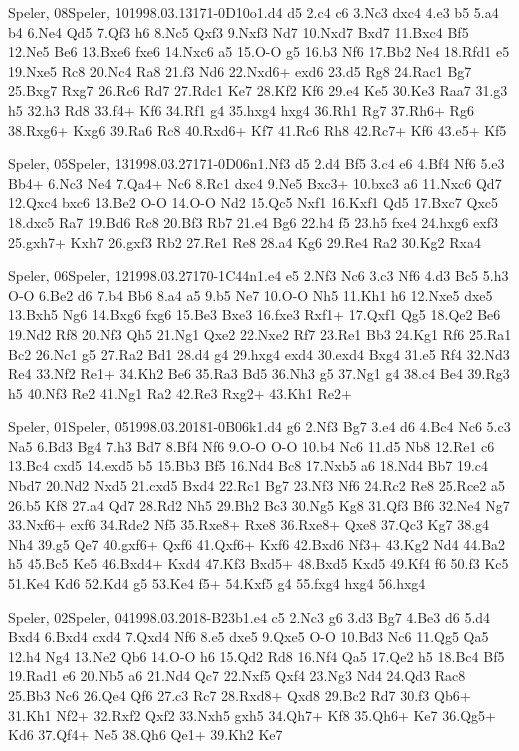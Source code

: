 \documentclass[twocolumn,a4paper,10pt]{report}
\begin{document}
\begin{chessgame}{Speler, 08}{Speler, 10}{1998.03.13}{17}{1-0}{D10o}{1.d4 d5 2.c4 c6 3.Nc3 dxc4 4.e3 b5 5.a4 b4 6.Ne4 Qd5 7.Qf3 h6 8.Nc5 Qxf3 9.Nxf3 Nd7 10.Nxd7 Bxd7 11.Bxc4 Bf5 12.Ne5 Be6 13.Bxe6 fxe6 14.Nxc6 a5 15.O-O g5 16.b3 Nf6 17.Bb2 Ne4 18.Rfd1 e5 19.Nxe5 Rc8 20.Nc4 Ra8 21.f3 Nd6 22.Nxd6+ exd6 23.d5 Rg8 24.Rac1 Bg7 25.Bxg7 Rxg7 26.Rc6 Rd7 27.Rdc1 Ke7 28.Kf2 Kf6 29.e4 Ke5 30.Ke3 Raa7 31.g3 h5 32.h3 Rd8 33.f4+ Kf6 34.Rf1 g4 35.hxg4 hxg4 36.Rh1 Rg7 37.Rh6+ Rg6 38.Rxg6+ Kxg6 39.Ra6 Rc8 40.Rxd6+ Kf7 41.Rc6 Rh8 42.Rc7+ Kf6 43.e5+ Kf5}\end{chessgame}
\begin{chessgame}{Speler, 05}{Speler, 13}{1998.03.27}{17}{1-0}{D06n}{1.Nf3 d5 2.d4 Bf5 3.c4 e6 4.Bf4 Nf6 5.e3 Bb4+ 6.Nc3 Ne4 7.Qa4+ Nc6 8.Rc1 dxc4 9.Ne5 Bxc3+ 10.bxc3 a6 11.Nxc6 Qd7 12.Qxc4 bxc6 13.Be2 O-O 14.O-O Nd2 15.Qc5 Nxf1 16.Kxf1 Qd5 17.Bxc7 Qxc5 18.dxc5 Ra7 19.Bd6 Rc8 20.Bf3 Rb7 21.e4 Bg6 22.h4 f5 23.h5 fxe4 24.hxg6 exf3 25.gxh7+ Kxh7 26.gxf3 Rb2 27.Re1 Re8 28.a4 Kg6 29.Re4 Ra2 30.Kg2 Rxa4}\end{chessgame}
\begin{chessgame}{Speler, 06}{Speler, 12}{1998.03.27}{17}{0-1}{C44n}{1.e4 e5 2.Nf3 Nc6 3.c3 Nf6 4.d3 Bc5 5.h3 O-O 6.Be2 d6 7.b4 Bb6 8.a4 a5 9.b5 Ne7 10.O-O Nh5 11.Kh1 h6 12.Nxe5 dxe5 13.Bxh5 Ng6 14.Bxg6 fxg6 15.Be3 Bxe3 16.fxe3 Rxf1+ 17.Qxf1 Qg5 18.Qe2 Be6 19.Nd2 Rf8 20.Nf3 Qh5 21.Ng1 Qxe2 22.Nxe2 Rf7 23.Re1 Bb3 24.Kg1 Rf6 25.Ra1 Bc2 26.Nc1 g5 27.Ra2 Bd1 28.d4 g4 29.hxg4 exd4 30.exd4 Bxg4 31.e5 Rf4 32.Nd3 Re4 33.Nf2 Re1+ 34.Kh2 Be6 35.Ra3 Bd5 36.Nh3 g5 37.Ng1 g4 38.c4 Be4 39.Rg3 h5 40.Nf3 Re2 41.Ng1 Ra2 42.Re3 Rxg2+ 43.Kh1 Re2+}\end{chessgame}
\begin{chessgame}{Speler, 01}{Speler, 05}{1998.03.20}{18}{1-0}{B06k}{1.d4 g6 2.Nf3 Bg7 3.e4 d6 4.Bc4 Nc6 5.c3 Na5 6.Bd3 Bg4 7.h3 Bd7 8.Bf4 Nf6 9.O-O O-O 10.b4 Nc6 11.d5 Nb8 12.Re1 c6 13.Bc4 cxd5 14.exd5 b5 15.Bb3 Bf5 16.Nd4 Bc8 17.Nxb5 a6 18.Nd4 Bb7 19.c4 Nbd7 20.Nd2 Nxd5 21.cxd5 Bxd4 22.Rc1 Bg7 23.Nf3 Nf6 24.Rc2 Re8 25.Rce2 a5 26.b5 Kf8 27.a4 Qd7 28.Rd2 Nh5 29.Bh2 Bc3 30.Ng5 Kg8 31.Qf3 Bf6 32.Ne4 Ng7 33.Nxf6+ exf6 34.Rde2 Nf5 35.Rxe8+ Rxe8 36.Rxe8+ Qxe8 37.Qc3 Kg7 38.g4 Nh4 39.g5 Qe7 40.gxf6+ Qxf6 41.Qxf6+ Kxf6 42.Bxd6 Nf3+ 43.Kg2 Nd4 44.Ba2 h5 45.Bc5 Ke5 46.Bxd4+ Kxd4 47.Kf3 Bxd5+ 48.Bxd5 Kxd5 49.Kf4 f6 50.f3 Kc5 51.Ke4 Kd6 52.Kd4 g5 53.Ke4 f5+ 54.Kxf5 g4 55.fxg4 hxg4 56.hxg4}\end{chessgame}
\begin{chessgame}{Speler, 02}{Speler, 04}{1998.03.20}{18}{\textonehalf-\textonehalf}{B23b}{1.e4 c5 2.Nc3 g6 3.d3 Bg7 4.Be3 d6 5.d4 Bxd4 6.Bxd4 cxd4 7.Qxd4 Nf6 8.e5 dxe5 9.Qxe5 O-O 10.Bd3 Nc6 11.Qg5 Qa5 12.h4 Ng4 13.Ne2 Qb6 14.O-O h6 15.Qd2 Rd8 16.Nf4 Qa5 17.Qe2 h5 18.Bc4 Bf5 19.Rad1 e6 20.Nb5 a6 21.Nd4 Qc7 22.Nxf5 Qxf4 23.Ng3 Nd4 24.Qd3 Rac8 25.Bb3 Nc6 26.Qe4 Qf6 27.c3 Rc7 28.Rxd8+ Qxd8 29.Bc2 Rd7 30.f3 Qb6+ 31.Kh1 Nf2+ 32.Rxf2 Qxf2 33.Nxh5 gxh5 34.Qh7+ Kf8 35.Qh6+ Ke7 36.Qg5+ Kd6 37.Qf4+ Ne5 38.Qh6 Qe1+ 39.Kh2 Ke7}\end{chessgame}
\end{document}
